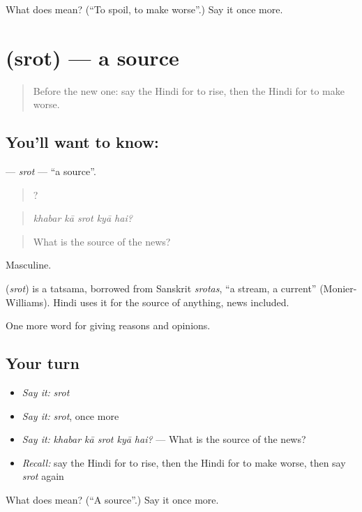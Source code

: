 \begin{tcolorbox}[breakable,colback=teal!4,colframe=teal!35!black,title={Before you move on}]
What does  mean? (\textquotedblleft{}To spoil, to make worse\textquotedblright{}.) Say it once more.
\end{tcolorbox}
\section[\texorpdfstring{\hi{स्रोत} (srot)}{स्रोत (srot)}]{ (srot) — a source}

\label{lesson:HI-C344-srot}



\begin{quote}
Before the new one: say the Hindi for to rise, then the Hindi for to make worse.
\end{quote}

\subsection*{You'll want to know: }
\textbf{} — \emph{srot} — \textquotedblleft{}a source\textquotedblright{}.

\begin{quote}
    ?
\end{quote}

\begin{quote}
\emph{khabar kā srot kyā hai?}
\end{quote}

\begin{quote}
What is the source of the news?
\end{quote}

Masculine.

\begin{cousinweb}
\textbf{} (\emph{srot}) is a tatsama, borrowed from Sanskrit \emph{srotas}, \textquotedblleft{}a stream, a current\textquotedblright{} (Monier-Williams). Hindi uses it for the source of anything, news included.
\end{cousinweb}

\begin{grammarlens}[title={What you've built}]
One more word for giving reasons and opinions.
\end{grammarlens}

\subsection*{Your turn}
\begin{itemize}
\raggedright
  \item \emph{Say it:} \emph{srot}
  \item \emph{Say it:} \emph{srot}, once more
  \item \emph{Say it:} \emph{khabar kā srot kyā hai?} — What is the source of the news?
  \item \emph{Recall:} say the Hindi for to rise, then the Hindi for to make worse, then say \emph{srot} again
\end{itemize}

\begin{tcolorbox}[breakable,colback=teal!4,colframe=teal!35!black,title={Before you move on}]
What does  mean? (\textquotedblleft{}A source\textquotedblright{}.) Say it once more.
\end{tcolorbox}
